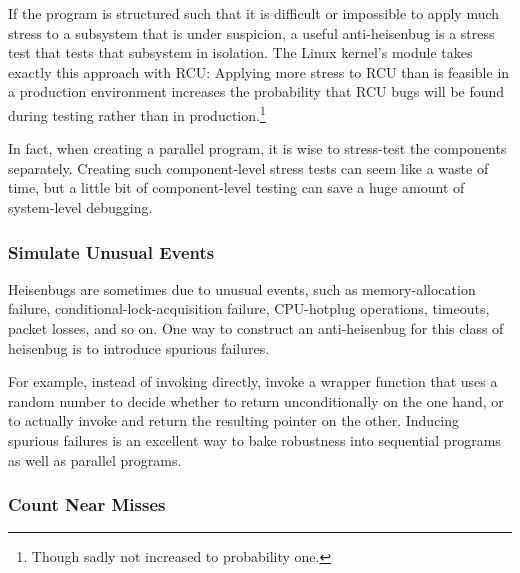 If the program is structured such that it is difficult or impossible
to apply much stress to a subsystem that is under suspicion,
a useful anti-heisenbug is a stress test that tests that subsystem in
isolation.
The Linux kernel's  module takes exactly this approach with RCU:
Applying more stress to RCU than is feasible in a production environment
increases the probability that RCU bugs will be found during testing
rather than in production.\footnote{
	Though sadly not increased to probability one.}

In fact, when creating a parallel program, it is wise to stress-test
the components separately.
Creating such component-level stress tests can seem like a waste of time,
but a little bit of component-level testing can save a huge amount
of system-level debugging.

\subsubsection{Simulate Unusual Events}
\label{sec:debugging:Simulate Unusual Events}

Heisenbugs are sometimes due to unusual events, such as
memory-allocation failure, conditional-lock-acquisition failure,
CPU-hotplug operations, timeouts, packet losses, and so on.
One way to construct an anti-heisenbug for this class of heisenbug
is to introduce spurious failures.

For example, instead of invoking  directly, invoke
a wrapper function that uses a random number to decide whether
to return  unconditionally on the one hand, or to actually
invoke  and return the resulting pointer on the other.
Inducing spurious failures is an excellent way to bake robustness into
sequential programs as well as parallel programs.

\QuickQuizEnd

\subsubsection{Count Near Misses}
\label{sec:debugging:Count Near Misses}

